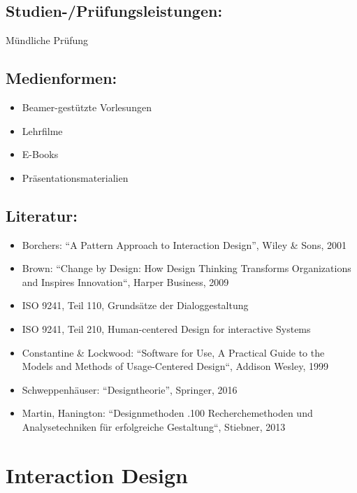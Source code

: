 \section*{Studien-/Prüfungsleistungen:}\label{studien-pruxfcfungsleistungen-4}

Mündliche Prüfung

\section*{Medienformen:}\label{medienformen-4}

\begin{itemize}
\item
  Beamer-gestützte Vorlesungen
\item
  Lehrfilme
\item
  E-Books
\item
  Präsentationsmaterialien
\end{itemize}

\section*{Literatur:}\label{literatur-4}

\begin{itemize}
\item
  Borchers: ``A Pattern Approach to Interaction Design'', Wiley \& Sons,
  2001
\item
  Brown: ``Change by Design: How Design Thinking Transforms
  Organizations and Inspires Innovation``, Harper Business, 2009
\item
  ISO 9241, Teil 110, Grundsätze der Dialoggestaltung
\item
  ISO 9241, Teil 210, Human-centered Design for interactive Systems
\item
  Constantine \& Lockwood: ``Software for Use, A Practical Guide to the
  Models and Methods of Usage-Centered Design``, Addison Wesley, 1999
\item
  Schweppenhäuser: ``Designtheorie'', Springer, 2016
\item
  Martin, Hanington: ``Designmethoden .100 Recherchemethoden und
  Analysetechniken für erfolgreiche Gestaltung``, Stiebner, 2013
\end{itemize}

\chapter{Interaction Design}\label{interaction-design}

